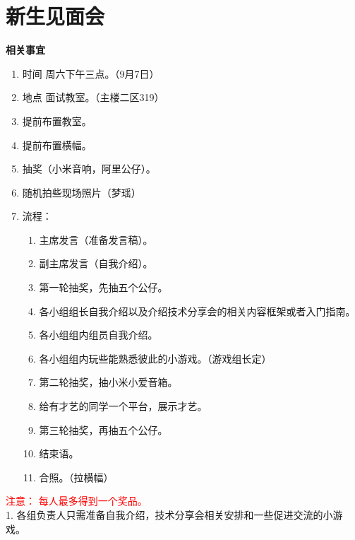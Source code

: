 \section{新生见面会}

\noindent\textbf{相关事宜}
\begin{enumerate}
  \item 时间 周六下午三点。（9月7日）
  \item 地点 面试教室。（主楼二区319）
  \item 提前布置教室。
  \item 提前布置横幅。
  \item 抽奖（小米音响，阿里公仔）。
  \item 随机拍些现场照片（梦瑶）
  \item 流程：
  \begin{enumerate}[(1)]
    \item 主席发言（准备发言稿）。
    \item 副主席发言（自我介绍）。
    \item 第一轮抽奖，先抽五个公仔。
    \item 各小组组长自我介绍以及介绍技术分享会的相关内容框架或者入门指南。
    \item 各小组组内组员自我介绍。
    \item 各小组组内玩些能熟悉彼此的小游戏。（游戏组长定）
    \item 第二轮抽奖，抽小米小爱音箱。
    \item 给有才艺的同学一个平台，展示才艺。
    \item 第三轮抽奖，再抽五个公仔。
    \item 结束语。
    \item 合照。（拉横幅）
  \end{enumerate}
\end{enumerate}

\noindent \textcolor{red}{注意： 每人最多得到一个奖品。}\\
1. 各组负责人只需准备自我介绍，技术分享会相关安排和一些促进交流的小游戏。
